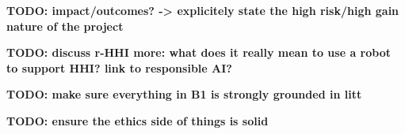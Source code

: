 \documentclass[11pt,a4paper]{report}
\newcommand{\TODO}[1]{{\color{red}\textbf{TODO: #1}}}
\begin{document}

\newcommand{\wpOne}{Framing robot-supported human-human interaction}
\newcommand{\wpOneShort}{Framing r-HHI}


\newcommand{\wpTwo}{Real-world Social Situation Assessment}
\newcommand{\wpTwoShort}{Social Situation Assessment}

\newcommand{\wpThree}{Trustworthy-by-design socio-cognitive architecture for robot-supported human-human interactions}
\newcommand{\wpThreeShort}{Socio-cognitive architecture}

\newcommand{\wpFour}{Data-driven social behaviour generation}
\newcommand{\wpFourShort}{Social behaviours}

\newcommand{\wpFive}{Evidence-based research: demonstrable usefulness of social robots in
real-world, complex scenarios}
\newcommand{\wpFiveShort}{Experimental investigation}







\newrefsection


\TODO{impact/outcomes? -> explicitely state the high risk/high gain nature of
the project}

\TODO{discuss r-HHI more: what does it really mean to use a robot to support
HHI? link to responsible AI?}

\TODO{make sure everything in B1 is strongly grounded in litt}

\TODO{ensure the ethics side of things is solid}
\end{document}

